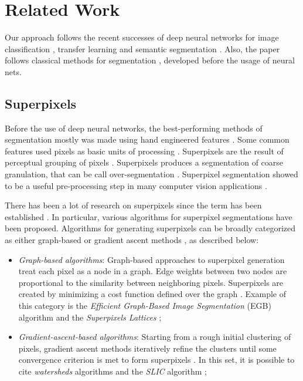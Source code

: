 \documentclass[10pt,twocolumn,letterpaper]{article}
\begin{document}
\section{Related Work} \label{sec:related_work}

Our approach follows the recent successes of deep neural networks for image classification \cite{VGGNET} \cite{AHMED_SARMA}, transfer learning \cite{PRATT} \cite{WEISS2016} and semantic segmentation \cite{SEGNET} \cite{UNET} \cite{FULLY_CONVOLU}. Also, the paper follows classical methods for segmentation \cite{WATERSHEDS} \cite{SLIC} \cite{LATTICES} \cite{FELZENSZWALB}, developed before the usage of neural nets.

\subsection{Superpixels} \label{ssec:superpixels}

Before the use of deep neural networks, the best-performing methods of segmentation mostly was made using hand engineered features \cite{SEGNET}. Some common features used pixels as basic units of processing \cite{WANG201728}. Superpixels are the result of perceptual grouping of pixels \cite{WANG201728}. Superpixels produces a segmentation of coarse granulation, that can be call over-segmentation \cite{WANG201728}. Superpixel segmentation showed to be a useful pre-processing step in many computer vision applications \cite{WANG201728}.

There has been a lot of research on superpixels since the term has been established \cite{WANG201728}. In particular, various algorithms for superpixel segmentations have been proposed. Algorithms for generating superpixels can be broadly categorized as either graph-based or gradient ascent methods \cite{SLIC}, as described below:

\begin{itemize}
 \item \textit{Graph-based algorithms}: Graph-based approaches to superpixel generation treat each pixel as a node in a graph. Edge weights between two nodes are proportional to the similarity between neighboring pixels. Superpixels are created by minimizing a cost function defined over the graph \cite{SLIC}. Example of this category is the \textit{Efficient Graph-Based Image Segmentation} (EGB) algorithm \cite{FELZENSZWALB} and the \textit{Superpixels Lattices} \cite{LATTICES};
 \item \textit{Gradient-ascent-based algorithms}: Starting from a rough initial clustering of pixels, gradient ascent methods iteratively refine the clusters until some convergence criterion is met to form superpixels \cite{SLIC}. In this set, it is possible to cite \textit{watersheds} algorithms \cite{WATERSHEDS} and the \textit{SLIC} algorithm \cite{SLIC};
\end{itemize}
\end{document}
